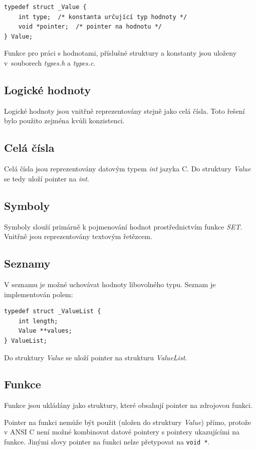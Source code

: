 \documentclass[12pt, a4paper]{report}
\begin{document}
\begin{lstlisting}
typedef struct _Value {
    int type;  /* konstanta určující typ hodnoty */
    void *pointer;  /* pointer na hodnotu */
} Value;
\end{lstlisting}

Funkce pro práci s hodnotami, příslušné struktury a konstanty jsou uloženy v~souborech \emph{types.h} a \emph{types.c}.

\subsection{Logické hodnoty}
Logické hodnoty jsou vnitřně reprezentovány stejně jako celá čísla. Toto řešení bylo použito zejména kvůli konzistenci.

\subsection{Celá čísla}
Celá čísla jsou reprezentovány datovým typem \emph{int} jazyka C.
Do struktury \emph{Value} se tedy uloží pointer na \emph{int}. 

\subsection{Symboly}
Symboly slouží primárně k pojmenování hodnot prostřednictvím funkce \emph{SET}. Vnitřně jsou reprezentovány textovým řetězcem.

\subsection{Seznamy}
V seznamu je možné uchovávat hodnoty libovolného typu. Seznam je implementován polem:

\begin{lstlisting}
typedef struct _ValueList {
	int length;
	Value **values;
} ValueList;
\end{lstlisting}
Do struktury \emph{Value} se uloží pointer na strukturu \emph{ValueList}.

\subsection{Funkce}
Funkce jsou ukládány jako struktury, které obsahují pointer na zdrojovou funkci.

Pointer na funkci nemůže být použit (uložen do struktury \emph{Value}) přímo, protože v ANSI C není možné kombinovat datové pointery s pointery ukazujícími na funkce. Jinými slovy pointer na funkci nelze přetypovat na \verb|void *|.
\end{document}
